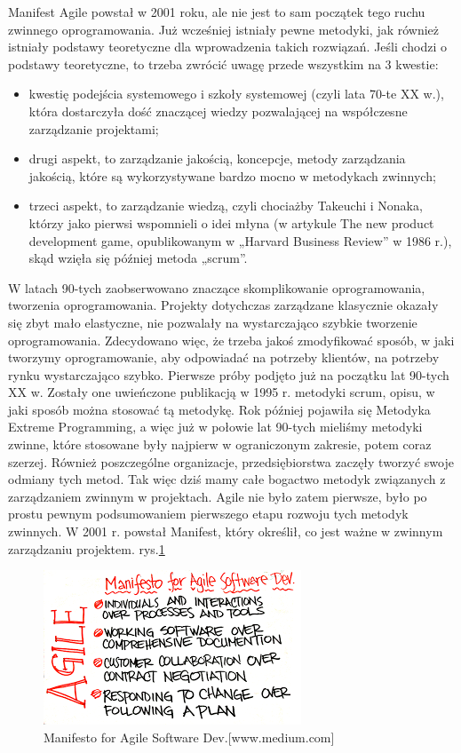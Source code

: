 Manifest Agile powstał w 2001 roku, ale nie jest to sam początek tego ruchu zwinnego oprogramowania. Już wcześniej istniały pewne metodyki, jak również istniały podstawy teoretyczne dla wprowadzenia takich rozwiązań. Jeśli chodzi o podstawy teoretyczne, to trzeba zwrócić uwagę przede wszystkim na 3 kwestie:
	\begin{itemize}
		\item kwestię podejścia systemowego i szkoły systemowej (czyli lata 70-te XX w.), która dostarczyła dość znaczącej wiedzy pozwalającej na współczesne zarządzanie projektami;
		\item drugi aspekt, to zarządzanie jakością, koncepcje, metody zarządzania jakością, które są wykorzystywane bardzo mocno w metodykach zwinnych;
		\item trzeci aspekt, to zarządzanie wiedzą, czyli chociażby Takeuchi i Nonaka, którzy jako pierwsi wspomnieli o idei młyna (w artykule The new product development game, opublikowanym w „Harvard Business Review” w 1986 r.), skąd wzięła się później metoda „scrum”.
	\end{itemize}
W latach 90-tych zaobserwowano znaczące skomplikowanie oprogramowania, tworzenia oprogramowania. Projekty dotychczas zarządzane klasycznie okazały się zbyt mało elastyczne, nie pozwalały na wystarczająco szybkie tworzenie oprogramowania. Zdecydowano więc, że trzeba jakoś zmodyfikować sposób, w jaki tworzymy oprogramowanie, aby odpowiadać na potrzeby klientów, na potrzeby rynku wystarczająco szybko. Pierwsze próby podjęto już na początku lat 90-tych XX w. Zostały one uwieńczone publikacją w 1995 r. metodyki scrum, opisu, w jaki sposób można stosować tą metodykę. Rok później pojawiła się Metodyka Extreme Programming, a więc już w połowie lat 90-tych mieliśmy metodyki zwinne, które stosowane były najpierw w ograniczonym zakresie, potem coraz szerzej. Również poszczególne organizacje, przedsiębiorstwa zaczęły tworzyć swoje odmiany tych metod. Tak więc dziś mamy całe bogactwo metodyk związanych z zarządzaniem zwinnym w projektach.
Agile nie było zatem pierwsze, było po prostu pewnym podsumowaniem pierwszego etapu rozwoju tych metodyk zwinnych. W 2001 r. powstał Manifest, który określił, co jest ważne w zwinnym zarządzaniu projektem. rys.\ref{rys:agile}

\begin{figure}
	\centering\includegraphics[width=.6\textwidth]{img/agile}
	\caption{Manifesto for Agile Software Dev.[www.medium.com]}  \label{rys:agile}%
\end{figure}

